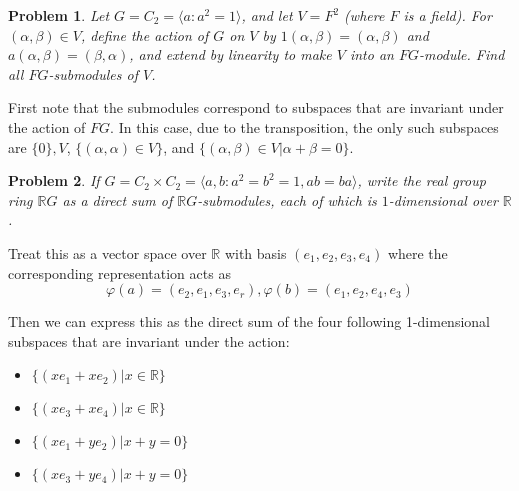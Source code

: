\documentclass[10pt]{article}
\newcommand{\sk}{\vskip 10mm}
\newcommand{\bb}[1]{\mathbb{#1}}
\theoremstyle{plain}
\newtheorem{problem}{Problem}
\theoremstyle{remark}
\begin{document}
\begin{problem}
  Let $G=C_2=\langle a:a^2=1\rangle$, and let $V=F^2$ (where $F$ is a field).
  For $(\alpha,\beta)\in V$, define the action of $G$ on $V$ by
  $1(\alpha,\beta)=(\alpha,\beta)$ and $a(\alpha,\beta)=(\beta,\alpha)$, and
  extend by linearity to make $V$ into an $FG$-module. Find all $FG$-submodules
  of $V$.
\end{problem}

First note that the submodules correspond to subspaces that are invariant
under the action of $FG$. In this case, due to the transposition, the only
such subspaces are $\{0\},V$, $\{(\alpha,\alpha)\in V\}$, and $\{(\alpha,\beta)\in V|\alpha+\beta=0\}$.

\sk

\begin{problem}
  If $G=C_2\times C_2=\langle a,b:a^2=b^2=1,ab=ba\rangle$, write the real group
  ring $\bb{R}G$ as a direct sum of $\bb{R}G$-submodules, each of which
  is $1$-dimensional over $\bb{R}$.
\end{problem}

Treat this as a vector space over $\bb{R}$ with basis $(e_1,e_2,e_3,e_4)$ where
the corresponding representation acts as
\[
  \varphi(a)=(e_2,e_1,e_3,e_r),\varphi(b)=(e_1,e_2,e_4,e_3)
\]

Then we can express this as the direct sum of the four following 1-dimensional
subspaces that are invariant under the action:
\begin{itemize}
\item $\{(xe_1+xe_2)|x\in\bb{R}\}$
\item $\{(xe_3+xe_4)|x\in\bb{R}\}$
\item $\{(xe_1+ye_2)|x+y=0\}$
\item $\{(xe_3+ye_4)|x+y=0\}$
\end{itemize}

\sk
\end{document}
